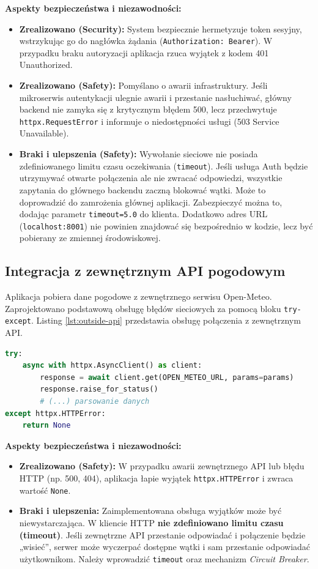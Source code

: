\documentclass[12pt,twoside]{article}
\begin{document}
\textbf{Aspekty bezpieczeństwa i niezawodności:}
\begin{itemize}
    \item \textbf{Zrealizowano (Security):} System bezpiecznie hermetyzuje token sesyjny, wstrzykując go do nagłówka żądania (\texttt{Authorization: Bearer}). W przypadku braku autoryzacji aplikacja rzuca wyjątek z kodem 401 Unauthorized.
    \item \textbf{Zrealizowano (Safety):} Pomyślano o awarii infrastruktury. Jeśli mikroserwis autentykacji ulegnie awarii i przestanie nasłuchiwać, główny backend nie zamyka się z krytycznym błędem 500, lecz przechwytuje \texttt{httpx.RequestError} i informuje o niedostępności usługi (503 Service Unavailable).
    \item \textbf{Braki i ulepszenia (Safety):} Wywołanie sieciowe nie posiada zdefiniowanego limitu czasu oczekiwania (\texttt{timeout}). Jeśli usługa Auth będzie utrzymywać otwarte połączenia ale nie zwracać odpowiedzi, wszystkie zapytania do głównego backendu zaczną blokować wątki. Może to doprowadzić do zamrożenia głównej aplikacji. Zabezpieczyć można to, dodając parametr \texttt{timeout=5.0} do klienta. Dodatkowo adres URL (\texttt{localhost:8001}) nie powinien znajdować się bezpośrednio w kodzie, lecz być pobierany ze zmiennej środowiskowej.
\end{itemize}

\subsection{Integracja z zewnętrznym API pogodowym}
Aplikacja pobiera dane pogodowe z zewnętrznego serwisu Open-Meteo. Zaprojektowano podstawową obsługę błędów sieciowych za pomocą bloku \texttt{try-except}. Listing \ref{lst:outside-api} przedstawia obsługę połączenia z zewnętrznym API.

\begin{lstlisting}[language=Python, caption={Obsługa połączenia z zewnętrznym API w \texttt{weather\_service.py}}, label=lst:outside-api]
try:
    async with httpx.AsyncClient() as client:
        response = await client.get(OPEN_METEO_URL, params=params)
        response.raise_for_status()
        # (...) parsowanie danych
except httpx.HTTPError:
    return None
\end{lstlisting}

\textbf{Aspekty bezpieczeństwa i niezawodności:}
\begin{itemize}
    \item \textbf{Zrealizowano (Safety):} W przypadku awarii zewnętrznego API lub błędu HTTP (np. 500, 404), aplikacja łapie wyjątek \texttt{httpx.HTTPError} i zwraca wartość \texttt{None}.
    \item \textbf{Braki i ulepszenia:} Zaimplementowana obsługa wyjątków może być niewystarczająca. W kliencie HTTP \textbf{nie zdefiniowano limitu czasu (timeout)}. Jeśli zewnętrzne API przestanie odpowiadać i połączenie będzie „wisieć”, serwer może wyczerpać dostępne wątki i sam przestanie odpowiadać użytkownikom. Należy wprowadzić \texttt{timeout} oraz mechanizm \textit{Circuit Breaker}.
\end{itemize}
\end{document}
